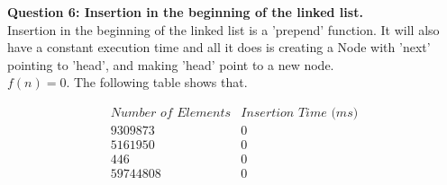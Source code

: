 \documentclass[11pt]{article}
\begin{document}
\textbf{Question 6: Insertion in the beginning of the linked list.}
\\Insertion in the beginning of the linked list is a 'prepend' function. It will also have a constant execution time and all it does is creating a Node with 'next' pointing to 'head', and making 'head' point to a new node.
\\$f(n) = 0$. The following table shows that.

\begin{displaymath}
\begin{array}{|c|c|}
\textit{Number of Elements} & \textit{Insertion Time (ms)}\\
\hline
 9309873 & 0\\
 5161950 & 0\\
 446 & 0\\
 59744808 & 0\\
\end{array}
\end{displaymath}
\end{document}
